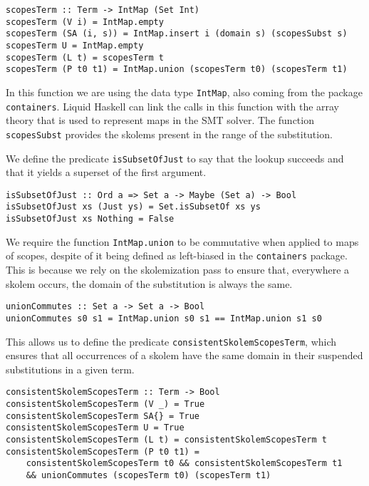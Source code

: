 \documentclass[sigconf, anonymous, review]{acmart}
\newcommand{\tc}[1]{{\small\texttt{#1}}}
\begin{document}
\begin{verbatim}
scopesTerm :: Term -> IntMap (Set Int)
scopesTerm (V i) = IntMap.empty
scopesTerm (SA (i, s)) = IntMap.insert i (domain s) (scopesSubst s)
scopesTerm U = IntMap.empty
scopesTerm (L t) = scopesTerm t
scopesTerm (P t0 t1) = IntMap.union (scopesTerm t0) (scopesTerm t1)
\end{verbatim}

In this function we are using the data type \tc{IntMap}, also coming from the
package \tc{containers}. Liquid Haskell can link the calls in this function
with the array theory that is used to represent maps in the SMT solver.
The function \tc{scopesSubst} provides the skolems present in the range of
the substitution.

We define the predicate \tc{isSubsetOfJust} to say that the lookup succeeds
and that it yields a superset of the first argument.

\begin{verbatim}
isSubsetOfJust :: Ord a => Set a -> Maybe (Set a) -> Bool
isSubsetOfJust xs (Just ys) = Set.isSubsetOf xs ys
isSubsetOfJust xs Nothing = False
\end{verbatim}

We require the function \tc{IntMap.union} to be commutative when applied to
maps of scopes, despite of it being
defined as left-biased in the \tc{containers} package. This is because we
rely on the skolemization pass to ensure that, everywhere a
skolem occurs, the domain of the substitution is always the same.

\begin{verbatim}
unionCommutes :: Set a -> Set a -> Bool
unionCommutes s0 s1 = IntMap.union s0 s1 == IntMap.union s1 s0
\end{verbatim}

This allows us to define the predicate \tc{consistentSkolemScopesTerm},
which ensures that all occurrences of a skolem have the same domain in
their suspended substitutions in a given term.

\begin{verbatim}
consistentSkolemScopesTerm :: Term -> Bool
consistentSkolemScopesTerm (V _) = True
consistentSkolemScopesTerm SA{} = True
consistentSkolemScopesTerm U = True
consistentSkolemScopesTerm (L t) = consistentSkolemScopesTerm t
consistentSkolemScopesTerm (P t0 t1) =
    consistentSkolemScopesTerm t0 && consistentSkolemScopesTerm t1
    && unionCommutes (scopesTerm t0) (scopesTerm t1)
\end{verbatim}
\end{document}
